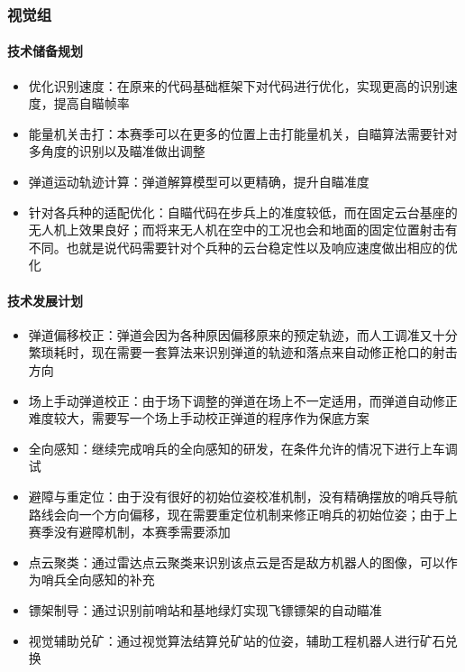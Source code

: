 \subsubsection{视觉组}

    \paragraph{技术储备规划}


        \begin{itemize}
            \item 优化识别速度：在原来的代码基础框架下对代码进行优化，实现更高的识别速度，提高自瞄帧率
            \item 能量机关击打：本赛季可以在更多的位置上击打能量机关，自瞄算法需要针对多角度的识别以及瞄准做出调整
            \item 弹道运动轨迹计算：弹道解算模型可以更精确，提升自瞄准度
            \item 针对各兵种的适配优化：自瞄代码在步兵上的准度较低，而在固定云台基座的无人机上效果良好；而将来无人机在空中的工况也会和地面的固定位置射击有不同。也就是说代码需要针对个兵种的云台稳定性以及响应速度做出相应的优化
        \end{itemize}
        
    \paragraph{技术发展计划}


        \begin{itemize}
            \item 弹道偏移校正：弹道会因为各种原因偏移原来的预定轨迹，而人工调准又十分繁琐耗时，现在需要一套算法来识别弹道的轨迹和落点来自动修正枪口的射击方向
            \item 场上手动弹道校正：由于场下调整的弹道在场上不一定适用，而弹道自动修正难度较大，需要写一个场上手动校正弹道的程序作为保底方案
            \item 全向感知：继续完成哨兵的全向感知的研发，在条件允许的情况下进行上车调试
            \item 避障与重定位：由于没有很好的初始位姿校准机制，没有精确摆放的哨兵导航路线会向一个方向偏移，现在需要重定位机制来修正哨兵的初始位姿；由于上赛季没有避障机制，本赛季需要添加
            \item 点云聚类：通过雷达点云聚类来识别该点云是否是敌方机器人的图像，可以作为哨兵全向感知的补充
            \item 镖架制导：通过识别前哨站和基地绿灯实现飞镖镖架的自动瞄准
            \item 视觉辅助兑矿：通过视觉算法结算兑矿站的位姿，辅助工程机器人进行矿石兑换
        \end{itemize}